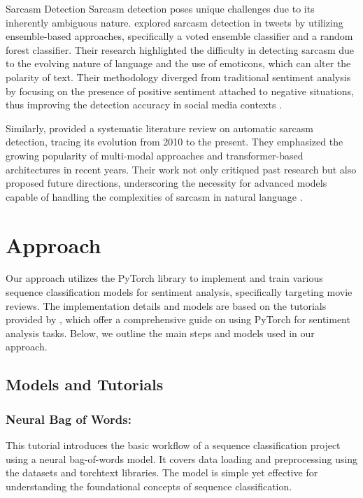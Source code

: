 \documentclass[11pt]{article}
\begin{document}
Sarcasm Detection
Sarcasm detection poses unique challenges due to its inherently ambiguous nature. \cite{Jain2017} explored sarcasm detection in tweets by utilizing ensemble-based approaches, specifically a voted ensemble classifier and a random forest classifier. Their research highlighted the difficulty in detecting sarcasm due to the evolving nature of language and the use of emoticons, which can alter the polarity of text. Their methodology diverged from traditional sentiment analysis by focusing on the presence of positive sentiment attached to negative situations, thus improving the detection accuracy in social media contexts .

Similarly, \cite{Baroiu2022} provided a systematic literature review on automatic sarcasm detection, tracing its evolution from 2010 to the present. They emphasized the growing popularity of multi-modal approaches and transformer-based architectures in recent years. Their work not only critiqued past research but also proposed future directions, underscoring the necessity for advanced models capable of handling the complexities of sarcasm in natural language .



\section{Approach}


Our approach utilizes the PyTorch library to implement and train various sequence classification models for sentiment analysis, specifically targeting movie reviews. The implementation details and models are based on the tutorials provided by \cite{Trevett2023}, which offer a comprehensive guide on using PyTorch for sentiment analysis tasks. Below, we outline the main steps and models used in our approach.


\subsection{Models and Tutorials}


\subsubsection{Neural Bag of Words:}

This tutorial introduces the basic workflow of a sequence classification project using a neural bag-of-words model. It covers data loading and preprocessing using the datasets and torchtext libraries. The model is simple yet effective for understanding the foundational concepts of sequence classification.
\end{document}
